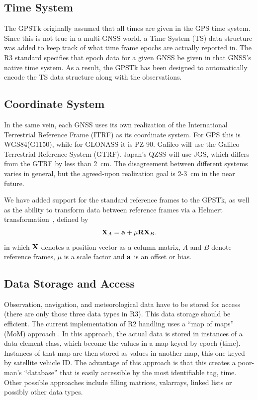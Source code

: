 \subsection*{Time System}

The GPSTk originally assumed that all times are given in the GPS time
system.  Since this is not true in a multi-GNSS world, a Time System
(TS) data structure was added to keep track of what time frame epochs
are actually reported in. The R3 standard specifies that epoch data
for a given GNSS be given in that GNSS's native time system.  As a
result, the GPSTk has been designed to automatically encode the TS
data structure along with the observations.

\subsection*{Coordinate System}

In the same vein, each GNSS uses its own realization of the
International Terrestrial Reference Frame (ITRF) as its coordinate
system.  For GPS this is WGS84(G1150), while for GLONASS it is PZ-90.
Galileo will use the Galileo Terrestrial Reference System (GTRF).
Japan's QZSS will use JGS, which differs from the GTRF by less than
2~cm.  The disagreement between different systems varies in general,
but the agreed-upon realization goal is 2-3~cm in the near future.

We have added support for the standard reference frames to the GPSTk,
as well as the ability to transform data between reference frames via
a Helmert transformation~\cite{Hofmann2008}, defined by
%
\begin{equation*}
{\bf X}_{A} = {\bf a} + \mu {\bf R} {\bf X}_{B}.
\end{equation*}
%
in which $\bf X$ denotes a position vector as a column matrix, $A$ and $B$ denote reference frames, $\mu$ is a scale factor and ${\bf a}$ is an offset or bias.


\subsection*{Data Storage and Access}

Observation, navigation, and meteorological data have to be stored for
access (there are only those three data types in R3).  This data
storage should be efficient.  The current implementation of R2
handling uses a ``map of maps'' (MoM) approach \cite{Stroustrup2000}.
In this approach, the actual data is stored in instances of a data
element class, which become the values in a map keyed by epoch (time).
Instances of that map are then stored as values in another map, this
one keyed by satellite vehicle ID.  The advantage of this approach is
that this creates a poor-man's ``database'' that is easily accessible
by the most identifiable tag, time.  Other possible approaches include
filling matrices, valarrays, linked lists or possibly other data
types.

